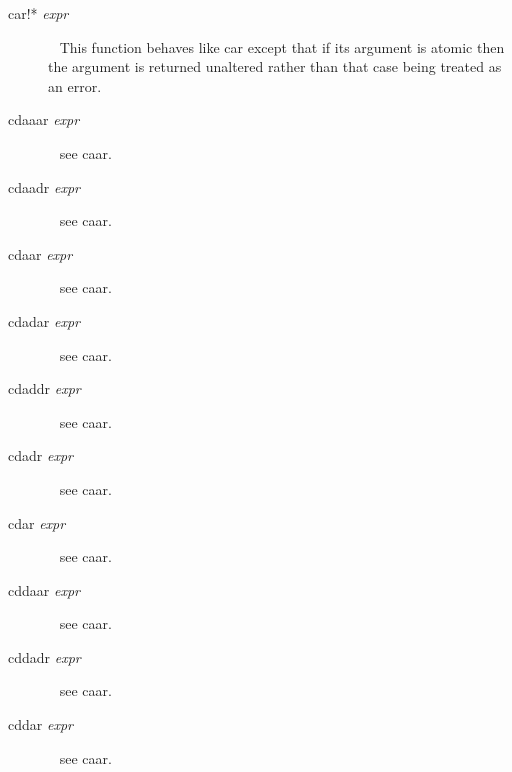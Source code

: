 \documentclass[a4paper,11pt]{article}
\begin{document}
\begin{description}
\item[{\ttfamily car!*} {\itshape expr}]  ~\newline
This function behaves like {\ttfamily car} except that if its argument
is atomic then the argument is returned unaltered rather than that case
being treated as an error.

\item[{\ttfamily cdaaar} {\itshape expr}]  ~\newline
see {\ttfamily caar}.

\item[{\ttfamily cdaadr} {\itshape expr}]  ~\newline
see {\ttfamily caar}.

\item[{\ttfamily cdaar} {\itshape expr}]  ~\newline
see {\ttfamily caar}.

\item[{\ttfamily cdadar} {\itshape expr}]  ~\newline
see {\ttfamily caar}.

\item[{\ttfamily cdaddr} {\itshape expr}]  ~\newline
see {\ttfamily caar}.

\item[{\ttfamily cdadr} {\itshape expr}]  ~\newline
see {\ttfamily caar}.

\item[{\ttfamily cdar} {\itshape expr}]  ~\newline
see {\ttfamily caar}.

\item[{\ttfamily cddaar} {\itshape expr}]  ~\newline
see {\ttfamily caar}.

\item[{\ttfamily cddadr} {\itshape expr}]  ~\newline
see {\ttfamily caar}.

\item[{\ttfamily cddar} {\itshape expr}]  ~\newline
see {\ttfamily caar}.


\end{description}
\end{document}
